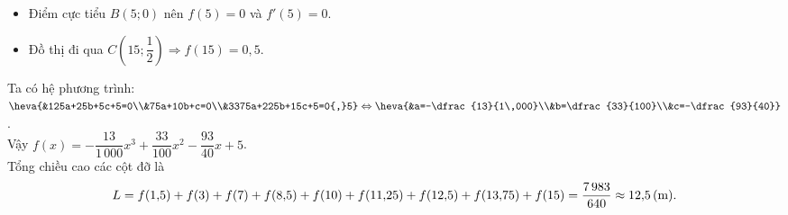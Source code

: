\begin{ex}
{\begin{itemize}
			\item Điểm cực tiểu $B(5;0)$ nên $f(5)=0$ và $f'(5)=0$.
			\item Đồ thị đi qua $C\left(15;\dfrac{1}{2}\right)\Rightarrow f(15)=0{,}5$.
		\end{itemize}
		Ta có hệ phương trình:
		$\heva{&125a+25b+5c+5=0\\&75a+10b+c=0\\&3375a+225b+15c+5=0{,}5}\Leftrightarrow\heva{&a=-\dfrac{13}{1\,000}\\&b=\dfrac{33}{100}\\&c=-\dfrac{93}{40}}$.\\
		Vậy $f(x)=-\dfrac{13}{1\,000}x^3+\dfrac{33}{100}x^2-\dfrac{93}{40}x+5$.\\
		Tổng chiều cao các cột đỡ là
		$$L=f(1{,}5)+f(3)+f(7)+f(8{,}5)+f(10)+f(11{,}25)+f(12{,}5)+f(13{,}75)+f(15)=\dfrac{7\,983}{640}\approx 12{,}5\text{\,(m).}$$
	}
\end{ex}

